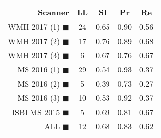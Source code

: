 \begin{tabular}{rcccc}
\toprule
Scanner & LL & SI & Pr & Re \\
\midrule
WMH 2017 (1) {\color[rgb]{ 1.00 0.00 0.00}$\blacksquare$} & 24 & 0.65 & 0.90 & 0.56 \\
WMH 2017 (2) {\color[rgb]{ 1.00 0.50 0.00}$\blacksquare$} & 17 & 0.76 & 0.89 & 0.68 \\
WMH 2017 (3) {\color[rgb]{ 1.00 0.80 0.00}$\blacksquare$} & 6 & 0.67 & 0.76 & 0.67 \\
MS  2016 (1) {\color[rgb]{ 0.20 0.80 0.00}$\blacksquare$} & 29 & 0.54 & 0.93 & 0.37 \\
MS  2016 (2) {\color[rgb]{ 0.00 0.40 1.00}$\blacksquare$} & 5 & 0.39 & 0.73 & 0.27 \\
MS  2016 (3) {\color[rgb]{ 0.60 0.00 1.00}$\blacksquare$} & 10 & 0.53 & 0.92 & 0.37 \\
ISBI MS 2015 {\color[rgb]{ 1.00 0.00 1.00}$\blacksquare$} & 5 & 0.69 & 0.81 & 0.67 \\
\midrule
ALL {\color[rgb]{ 1.00 1.00 1.00}$\blacksquare$} & 12 & 0.68 & 0.83 & 0.62 \\
\bottomrule
\end{tabular}